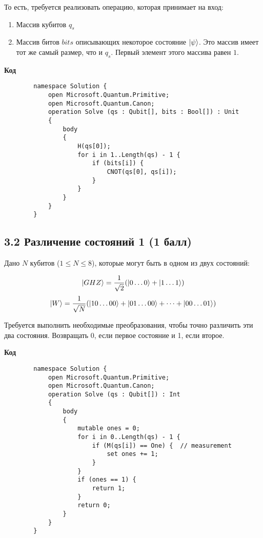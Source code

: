 \documentclass[a4paper,12pt]{article}
\DeclarePairedDelimiter\ket{\lvert}{\rangle}
\begin{document}
    То есть, требуется реализовать операцию, которая принимает на вход:
    \begin{enumerate}
        \item Массив кубитов $q_s$
        \item Массив битов $bits$ описывающих некоторое состояние $\ket{\psi}$. Это массив имеет тот же самый размер, что и $q_s$. Первый элемент этого массива равен $1$.
    \end{enumerate}
    \textbf{Код}
    
    \begin{lstlisting}
        namespace Solution {
            open Microsoft.Quantum.Primitive;
            open Microsoft.Quantum.Canon;
            operation Solve (qs : Qubit[], bits : Bool[]) : Unit 
            {
                body
                {
                    H(qs[0]);
                    for i in 1..Length(qs) - 1 {
                        if (bits[i]) {
                            CNOT(qs[0], qs[i]);
                        }
                    }
                }
            }
        }
    \end{lstlisting}
    
    \subsection*{3.2 Различение состояний 1 (1 балл)}

    Дано $N$ кубитов ($1 \le N \le 8$), которые могут быть в одном из двух состояний:
    
    $$\ket{GHZ} = \frac{1}{\sqrt2}(\ket{0\dots0} +\ket{1\dots1})$$
    $$\ket{W} = \frac{1}{\sqrt N}(\ket{10\dots00}+\ket{01\dots00} + \dots +\ket{00\dots01})$$
    
    Требуется выполнить необходимые преобразования, чтобы точно различить эти два состояния. Возвращать $0$, если первое состояние и 1, если второе. 
    
    \textbf{Код}

    \begin{lstlisting}
        namespace Solution {
            open Microsoft.Quantum.Primitive;
            open Microsoft.Quantum.Canon;
            operation Solve (qs : Qubit[]) : Int 
            {
                body
                {
                    mutable ones = 0;
                    for i in 0..Length(qs) - 1 {
                        if (M(qs[i]) == One) {  // measurement
                            set ones += 1;
                        }
                    }
                    if (ones == 1) {
                        return 1;
                    }
                    return 0;
                }
            }
        }
    \end{lstlisting}
 
    
\newpage
\end{document}
